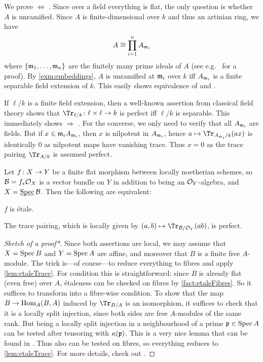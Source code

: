 \documentclass[a4paper, 10pt, oneside, DIV=9, chapterprefix=true, numbers=enddot, bibliography=totoc]{scrbook}
\begin{document}
\begin{proof*}
	We prove  $\Leftrightarrow$ . Since over a field everything is flat, the only question is whether $A$ is unramified. Since $A$ is finite-dimensional over $k$ and thus an artinian ring, we have 
	\begin{equation*}
		A\cong \prod_{i=1}^nA_{\mathfrak{m}_i}
	\end{equation*}
	where $\{\mathfrak{m}_1,\dotsc,\mathfrak{m}_n\}$ are the finitely many prime ideals of $A$ (see e.g.\ \cite[Corollary~2.16]{eisenbudCommAlg} for a proof). By \cref{exm:embeddings}, $A$ is unramified at $\mathfrak{m}_i$ over $k$ iff $A_{\mathfrak{m}_i}$ is a finite separable field extension of $k$. This easily shows equivalence of  and .
	
	If $\ell/k$ is a finite field extension, then a well-known assertion from classical field theory shows that $\Tr_{\ell/k}\colon \ell\times\ell\morphism k$ is perfect iff $\ell/k$ is separable. This immediately shows  $\Rightarrow$ . For the converse, we only need to verify that all $A_{\mathfrak{m}_i}$ are fields. But if $x\in\mathfrak{m}_iA_{\mathfrak{m}_i}$, then $x$ is nilpotent in $A_{\mathfrak{m}_i}$, hence $a\mapsto \Tr_{A_{\mm_i}/k}(ax)$ is identically $0$ as nilpotent maps have vanishing trace. Thus $x=0$ as the trace pairing $\Tr_{A/k}$ is assumed perfect.
\end{proof*}
\begin{prop}\label{prop:finiteEtale}
	Let $f\colon X\morphism Y$ be a finite flat morphism between locally noetherian schemes, so $\mathcal{B}=f_*\mathcal{O}_X$ is a vector bundle on $Y$ in addition to being an $\mathcal{O}_Y$-algebra, and $X=\operatorname{\underline{\smash{\mathrm{Spec}}}} \mathcal{B}$. Then the following are equivalent:
	\begin{alphanumerate}
		\item $f$ is étale.
		\item The trace pairing, which is locally given by $(a,b)\mapsto \Tr_{\Bb/\Oo_Y}(ab)$, is perfect.
	\end{alphanumerate}
\end{prop}
\begin{proof}[Sketch of a proof\textup{*}]
	Since both assertions are local, we may assume that $X=\operatorname{Spec} B$ and $Y=\operatorname{Spec} A$ are affine, and moreover that $B$ is a finite free $A$-module. The trick is---of course---to reduce everything to fibres and apply \cref{lem:etaleTrace}. For condition  this is straightforward: since $B$ is already flat (even free) over $A$, étaleness can be checked on fibres by \cref{fact:etaleFibres}. So it suffices to transform  into a fibre-wise condition. To show that the map $B\morphism\Hom_A(B,A)$ induced by $\Tr_{B/A}$ is an isomorphism, it suffices to check that it is a locally split injection, since both sides are free $A$-modules of the same rank. But being a locally split injection in a neighbourhood of a prime $\mathfrak{p}\in\operatorname{Spec} A$ can be tested after tensoring with $\kappa(\mathfrak{p})$. This is a very nice lemma that can be found in \cite[Ch. (19.1.12)]{egaIV1}. Thus also  can be tested on fibres, so everything reduces to \cref{lem:etaleTrace}. For more details, check out \cite[Proposition~2.7.2]{jacobians}.
\end{proof}
\end{document}
